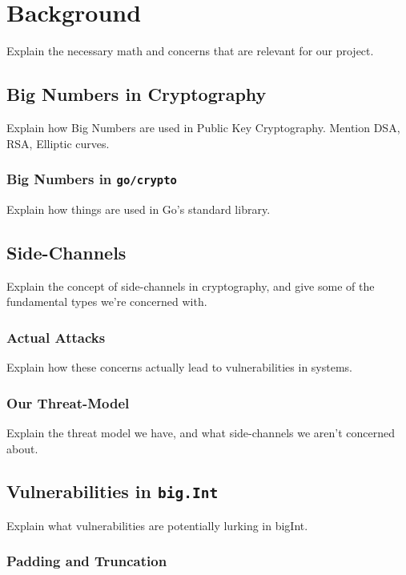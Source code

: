 \documentclass[11pt, a4paper, twocolumn]{article} %
\begin{document}
{\section{Background}

Explain the necessary math and concerns that are relevant for our project.

\subsection{Big Numbers in Cryptography}

Explain how Big Numbers are used in Public Key Cryptography. Mention
DSA, RSA, Elliptic curves.

\subsubsection{Big Numbers in \texttt{go/crypto}}

Explain how things are used in Go's standard library.

\subsection{Side-Channels}

Explain the concept of side-channels in cryptography, and give some of
the fundamental types we're concerned with.

\subsubsection{Actual Attacks}

Explain how these concerns actually lead to vulnerabilities in systems.

\subsubsection{Our Threat-Model}

Explain the threat model we have, and what side-channels we aren't concerned
about.

\subsection{Vulnerabilities in \texttt{big.Int}}

Explain what vulnerabilities are potentially lurking in bigInt.

\subsubsection{Padding and Truncation}

}
\end{document}
